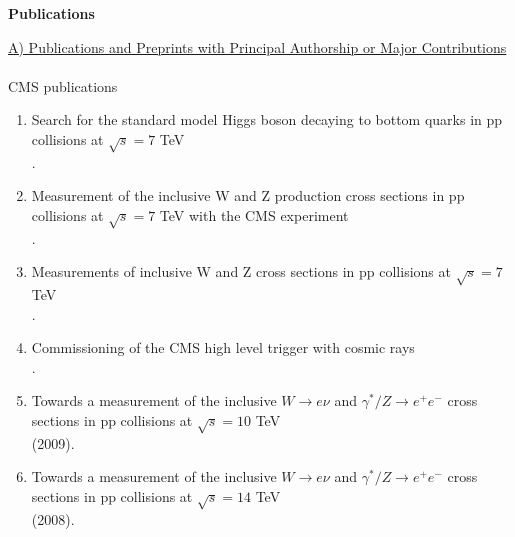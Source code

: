\documentclass [12pt]{report}
\begin{document}
\clearpage
\newpage

\begin{center} \Large {\bf Publications} \vspace*{5mm}\\  
\end{center} 


\noindent\underline{A) Publications and Preprints with Principal
Authorship or Major Contributions}
\\ \\
CMS publications 

\begin{enumerate}

\item Search for the standard model Higgs boson decaying to bottom quarks in pp collisions at $\sqrt{s}=7$ TeV\\
.

\item Measurement of the inclusive W and Z production cross sections in pp collisions at $\sqrt{s} = 7$ TeV with the CMS experiment\\
.

\item Measurements of inclusive W and Z cross sections in pp collisions at $\sqrt{s} = 7$ TeV\\
.

\item Commissioning of the CMS high level trigger with cosmic rays\\
.

\item Towards a measurement of the inclusive $W\rightarrow e\nu$ and $\gamma^* /Z \rightarrow e^+e^−$ cross sections in pp collisions at $\sqrt{s} = 10$ TeV\\
 (2009).

\item Towards a measurement of the inclusive $W\rightarrow e\nu$ and $\gamma^* /Z \rightarrow e^+e^−$ cross sections in pp collisions at $\sqrt{s} = 14$ TeV\\
 (2008).


\end{enumerate}
\end{document}
